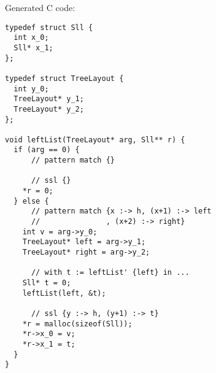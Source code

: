 \noindent
Generated C code:

\begin{lstlisting}
typedef struct Sll {
  int x_0;
  Sll* x_1;
};

typedef struct TreeLayout {
  int y_0;
  TreeLayout* y_1;
  TreeLayout* y_2;
};

void leftList(TreeLayout* arg, Sll** r) {
  if (arg == 0) {
      // pattern match {}

      // ssl {}
    *r = 0;
  } else {
      // pattern match {x :-> h, (x+1) :-> left
      //               , (x+2) :-> right}
    int v = arg->y_0;
    TreeLayout* left = arg->y_1;
    TreeLayout* right = arg->y_2;

      // with t := leftList' {left} in ...
    Sll* t = 0;
    leftList(left, &t);

      // ssl {y :-> h, (y+1) :-> t}
    *r = malloc(sizeof(Sll));
    *r->x_0 = v;
    *r->x_1 = t;
  }
}
\end{lstlisting}


